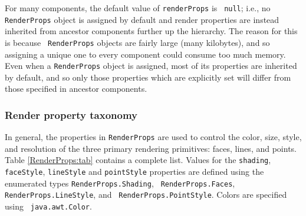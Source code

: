 For many components, the default value of {\tt renderProps} is {\tt
null}; i.e., no {\tt RenderProps} object is assigned by default and
render properties are instead inherited from ancestor components
further up the hierarchy. The reason for this is because {\tt
RenderProps} objects are fairly large (many kilobytes), and so
assigning a unique one to every component could consume too much
memory. Even when a {\tt RenderProps} object is assigned, most of its
properties are inherited by default, and so only those properties
which are explicitly set will differ from those specified in ancestor
components.

\subsubsection{Render property taxonomy}

In general, the properties in {\tt RenderProps} are used to control
the color, size, style, and resolution of the three primary rendering
primitives: faces, lines, and points. Table \ref{RenderProps:tab}
contains a complete list. Values for the {\tt shading}, {\tt
faceStyle}, {\tt lineStyle} and {\tt pointStyle} properties are
defined using the enumerated types {\tt RenderProps.Shading}, {\tt
RenderProps.Faces}, {\tt RenderProps.LineStyle}, and {\tt
RenderProps.PointStyle}.  Colors are specified using {\tt
java.awt.Color}.

